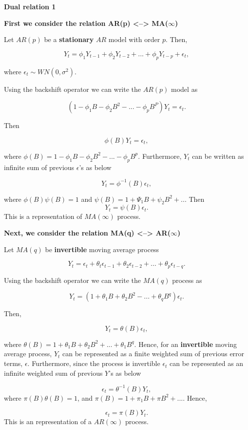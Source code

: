 \documentclass[]{book}
\begin{document}
\textbf{Dual relation 1}

\textbf{First we consider the relation AR(p) \textless{}--\textgreater{} MA(}\(\infty\)\textbf{)}

Let \(AR(p)\) be a \textbf{stationary} \(AR\) model with order \(p\). Then,

\[Y_t = \phi_1Y_{t-1}+ \phi_2Y_{t-2}+...+ \phi_pY_{t-p}+\epsilon_t,\]

where \(\epsilon_t \sim WN(0, \sigma^2).\)

Using the backshift operator we can write the \(AR(p)\) model as

\[(1-\phi_1B-\phi_2B^2-...-\phi_pB^P)Y_t=\epsilon_t.\]

Then

\[\phi(B)Y_t=\epsilon_t,\]

where \(\phi(B)=1-\phi_1B-\phi_2B^2-...-\phi_pB^p.\) Furthermore, \(Y_t\) can be written as infinite sum of previous \(\epsilon\)'s as below

\[Y_t = \phi^{-1}(B)\epsilon_t,\]

where \(\phi(B)\psi(B)=1\) and \(\psi(B)=1+\Psi_1B+\psi_2B^2+...\) Then \[Y_t=\psi(B)\epsilon_t.\]
This is a representation of \(MA(\infty)\) process.

\textbf{Next, we consider the relation MA(q) \textless{}--\textgreater{} AR(}\(\infty\)\textbf{)}

Let \(MA(q)\) be \textbf{invertible} moving average process

\[Y_t = \epsilon_t + \theta_t\epsilon_{t-1}+\theta_2\epsilon_{t-2}+...+\theta_p\epsilon_{t-q}.\]

Using the backshift operator we can write the \(MA(q)\) process as

\[Y_t = (1+\theta_1B+\theta_2B^2-...+\theta_qB^q)\epsilon_t.\]

Then,

\[Y_t = \theta(B)\epsilon_t,\]

where \(\theta(B)=1+\theta_1B+\theta_2B^2+...+\theta_1B^q.\) Hence, for an \textbf{invertible} moving average process, \(Y_t\) can be represented as a finite weighted sum of previous error terms, \(\epsilon\). Furthermore, since the process is invertible \(\epsilon_t\) can be represented as an infinite weighted sum of previous \(Y\)'s as below

\[\epsilon_t=\theta^{-1}(B)Y_t,\]
where \(\pi(B)\theta(B)=1\), and \(\pi(B) = 1+\pi_1B+\pi B^2+...\). Hence,

\[\epsilon_t = \pi(B)Y_t.\] This is an representation of a \(AR(\infty)\) process.
\end{document}
